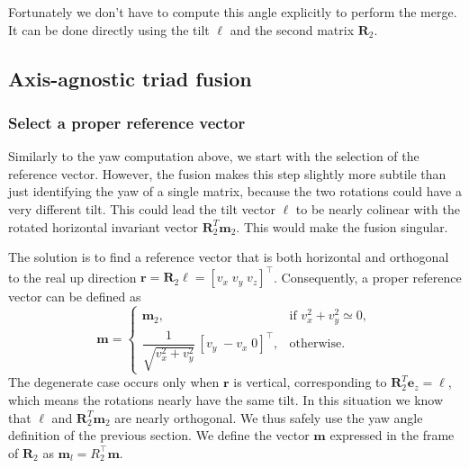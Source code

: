 \documentclass[10pt,twocolumn]{ICCAS}
\begin{document}
 Fortunately we don't have to compute this angle explicitly to perform the merge. It can be done directly using the tilt $\boldsymbol{\ell}$ and the second matrix $\boldsymbol{R}_{2}$.

\subsection{Axis-agnostic triad fusion}
\label{sec:triad_fusion}

\subsubsection{Select a proper reference vector}
Similarly to the yaw computation above, we start with the selection of the reference vector. However, the fusion makes this step slightly more subtile than just identifying the yaw of a single matrix, because the two rotations could have a very different tilt. This could lead the tilt vector $\boldsymbol{\ell}$ to be nearly colinear with the rotated horizontal invariant vector $\boldsymbol{R}_{2}^T\boldsymbol{m}_2$. This would make the fusion singular. 

The solution is to find a reference vector that is both horizontal and orthogonal to the real up direction $\boldsymbol{r}=\boldsymbol{R}_{2}\boldsymbol{\ell}=[v_{x}\;v_{y}\;v_{z}]^{\top}$.
Consequently, a proper reference vector can be defined as
\begin{equation}
  \scriptstyle{
  \boldsymbol{m}
  =
  \begin{cases}
    \boldsymbol{m}_2, &
      \text{if } v_{x}^{2}+v_{y}^{2}\simeq0,\\[6pt]
    \dfrac{1}{\sqrt{v_{x}^{2}+v_{y}^{2}}}\,[v_{y}\;-v_{x}\;0]^{\top},
    & \text{otherwise.}
  \end{cases}
  }
\end{equation}
The degenerate case occurs only when $\boldsymbol{r}$ is vertical, corresponding to $\boldsymbol{R}_{2}^{T}\boldsymbol{e}_{z} = \boldsymbol{\ell}$, which means the rotations nearly have the same tilt. In this situation we know that $\boldsymbol{\ell}$ and $\boldsymbol{R}_{2}^T\boldsymbol{m}_2$ are nearly orthogonal. We thus safely use the yaw angle definition of the previous section. We define the vector $\boldsymbol{m}$ expressed in the frame of $\boldsymbol{R}_{2}$ as 
$\boldsymbol{m}_{l}=R_{2}^{\top}\boldsymbol{m}$.
\end{document}
